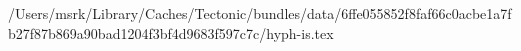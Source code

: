 /Users/msrk/Library/Caches/Tectonic/bundles/data/6ffe055852f8faf66c0acbe1a7fb27f87b869a90bad1204f3bf4d9683f597c7c/hyph-is.tex